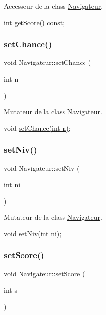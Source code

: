 Accesseur de la class \hyperlink{class_navigateur}{Navigateur}. 

int \hyperlink{class_navigateur_a52606df1f11308074aa64a81cc25e467}{get\+Score() const}; \mbox{\label{class_navigateur_a4b626cdf47683b637b1e9e000fae467b}} 
\subsubsection{\texorpdfstring{set\+Chance()}{setChance()}}
{\footnotesize\ttfamily void Navigateur\+::set\+Chance (\begin{DoxyParamCaption}\item[{int}]{n }\end{DoxyParamCaption})}



Mutateur de la class \hyperlink{class_navigateur}{Navigateur}. 

void \hyperlink{class_navigateur_a4b626cdf47683b637b1e9e000fae467b}{set\+Chance(int n)}; \mbox{\label{class_navigateur_af5d5be24410820dfebd15fb5b0966920}} 
\subsubsection{\texorpdfstring{set\+Niv()}{setNiv()}}
{\footnotesize\ttfamily void Navigateur\+::set\+Niv (\begin{DoxyParamCaption}\item[{int}]{ni }\end{DoxyParamCaption})}



Mutateur de la class \hyperlink{class_navigateur}{Navigateur}. 

void \hyperlink{class_navigateur_af5d5be24410820dfebd15fb5b0966920}{set\+Niv(int ni)}; \mbox{\label{class_navigateur_a85b21f5d57ed9e03e3276c369eb00fd7}} 
\subsubsection{\texorpdfstring{set\+Score()}{setScore()}}
{\footnotesize\ttfamily void Navigateur\+::set\+Score (\begin{DoxyParamCaption}\item[{int}]{s }\end{DoxyParamCaption})}



